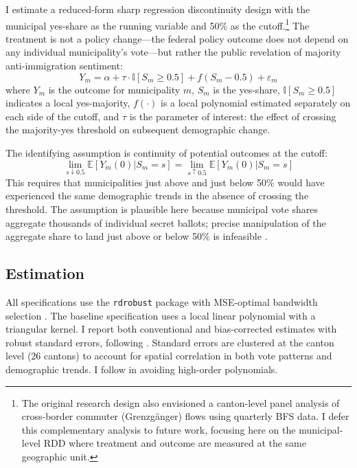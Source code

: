 \documentclass[12pt]{article}
\newcommand{\E}{\mathbb{E}}
\newcommand{\ind}{\mathbb{I}}
\begin{document}
I estimate a reduced-form sharp regression discontinuity design with the municipal yes-share as the running variable and 50\% as the cutoff.\footnote{The original research design also envisioned a canton-level panel analysis of cross-border commuter (Grenzg\"anger) flows using quarterly BFS data. I defer this complementary analysis to future work, focusing here on the municipal-level RDD where treatment and outcome are measured at the same geographic unit.} The treatment is not a policy change---the federal policy outcome does not depend on any individual municipality's vote---but rather the public revelation of majority anti-immigration sentiment:
\begin{equation}
Y_m = \alpha + \tau \cdot \ind[S_m \geq 0.5] + f(S_m - 0.5) + \varepsilon_m
\label{eq:rdd}
\end{equation}
where $Y_m$ is the outcome for municipality $m$, $S_m$ is the yes-share, $\ind[S_m \geq 0.5]$ indicates a local yes-majority, $f(\cdot)$ is a local polynomial estimated separately on each side of the cutoff, and $\tau$ is the parameter of interest: the effect of crossing the majority-yes threshold on subsequent demographic change.

The identifying assumption is continuity of potential outcomes at the cutoff:
\begin{equation}
\lim_{s \downarrow 0.5} \E[Y_m(0) | S_m = s] = \lim_{s \uparrow 0.5} \E[Y_m(0) | S_m = s]
\end{equation}
This requires that municipalities just above and just below 50\% would have experienced the same demographic trends in the absence of crossing the threshold. The assumption is plausible here because municipal vote shares aggregate thousands of individual secret ballots; precise manipulation of the aggregate share to land just above or below 50\% is infeasible \citep{mccrary2008, lee2008}.

\subsection{Estimation}

All specifications use the \texttt{rdrobust} package \citep{calonico2014, cattaneo2020practical} with MSE-optimal bandwidth selection \citep{imbens2012}. The baseline specification uses a local linear polynomial with a triangular kernel. I report both conventional and bias-corrected estimates with robust standard errors, following \citet{cattaneo2020practical}. Standard errors are clustered at the canton level (26 cantons) to account for spatial correlation in both vote patterns and demographic trends. I follow \citet{gelman2019} in avoiding high-order polynomials.
\end{document}
